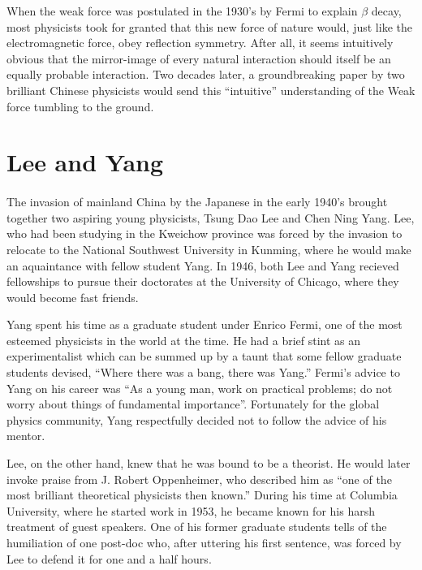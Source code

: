 \documentclass[12pt]{book}
\begin{document}
When the weak force was postulated in the 1930's by Fermi to explain $\beta$ decay, most physicists took for granted that this new force of nature would, just like the electromagnetic force, obey reflection symmetry. After all, it seems intuitively obvious that the mirror-image of every natural interaction should itself be an equally probable interaction. Two decades later, a groundbreaking paper by two brilliant Chinese physicists would send this ``intuitive'' understanding of the Weak force tumbling to the ground.

\section{Lee and Yang}

\paragraph*{}The invasion of mainland China by the Japanese in the early 1940's brought together two aspiring young physicists, Tsung Dao Lee and Chen Ning Yang. Lee, who had been studying in the Kweichow province was forced by the invasion to relocate to the National Southwest University in Kunming, where he would make an aquaintance with fellow student Yang. In 1946, both Lee and Yang recieved fellowships to pursue their doctorates at the University of Chicago, where they would become fast friends.

Yang spent his time as a graduate student under Enrico Fermi, one of the most esteemed physicists in the world at the time. He had a brief stint as an experimentalist which can be summed up by a taunt that some fellow graduate students devised, ``Where there was a bang, there was Yang.''\cite{bernstein} Fermi's advice to Yang on his career was ``As a young man, work on practical problems; do not worry about things of fundamental importance''\cite{segre}. Fortunately for the global physics community, Yang respectfully decided not to follow the advice of his mentor.

Lee, on the other hand, knew that he was bound to be a theorist. He would later invoke praise from J. Robert Oppenheimer, who described him as ``one of the most brilliant theoretical physicists then known.''\cite{nobel} During his time at Columbia University, where he started work in 1953, he became known for his harsh treatment of guest speakers. One of his former graduate students tells of the humiliation of one post-doc who, after uttering his first sentence, was forced by Lee to defend it for one and a half hours\cite{derman}.
\end{document}
